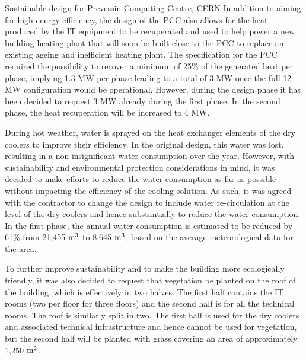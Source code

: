 \documentclass[../SustainableHEP.tex]{subfiles}
\begin{document}
\begin{bestpractice}{Sustainable design for Prevessin Computing Centre, CERN}
In addition to aiming for high energy efficiency, the design of the PCC
also allows for the heat produced by the IT equipment to be recuperated
and used to help power a new building heating plant that will soon be
built close to the PCC to replace an existing ageing and inefficient
heating plant. 
The specification for the PCC required the possibility
to recover a minimum of 25\% of the generated heat per phase, implying
1.3 MW per phase leading to a total of 3 MW once the full 12 MW
configuration would be operational. However, during the design phase it
has been decided to request 3 MW already during the first phase. In the
second phase, the heat recuperation will be increased to 4 MW.

During hot weather, water is sprayed on the heat exchanger elements of
the dry coolers to improve their efficiency. In the original design, this
water was lost, resulting in a non-insignificant water consumption over
the year. However, with sustainability and environmental protection
considerations in mind, it was decided to make efforts to reduce the
water consumption as far as possible without impacting the efficiency of
the cooling solution. As such, it was agreed with the contractor to
change the design to include water re-circulation at the level of the dry
coolers and hence substantially to reduce the water consumption. In the
first phase, the annual water consumption is estimated to be reduced by 61\% from
21,455 ${\rm m}^3$ to 8,645 ${\rm m}^3$, based on the average meteorological data for the area.

To further improve sustainability and to make the building more
ecologically friendly, it was also decided to request that vegetation be
planted on the roof of the building, which is effectively in two halves.
The first half contains the IT rooms (two per floor for three floors) and
the second half is for all the technical rooms. The roof is similarly
split in two. The first half is used for the dry coolers and associated
technical infrastructure and hence cannot be used for vegetation, but
the second half will be planted with grass covering an area of
approximately 1,250 ${\rm m}^2$.
\end{bestpractice}
\end{document}
